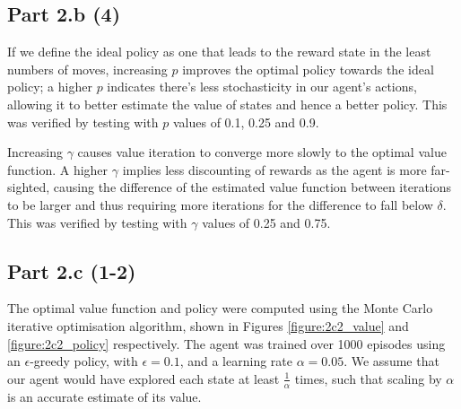 \documentclass[12pt]{article}
\begin{document}
\subsection*{Part 2.b (4)}

If we define the ideal policy as one that leads to the reward state in the least numbers of moves, increasing \(p\) improves the optimal policy towards the ideal policy; a higher \(p\) indicates there's less stochasticity in our agent's actions, allowing it to better estimate the value of states and hence a better policy. This was verified by testing with \(p\) values of 0.1, 0.25 and 0.9.\medskip

Increasing \(\gamma\) causes value iteration to converge more slowly to the optimal value function. A higher \(\gamma\) implies less discounting of rewards as the agent is more far-sighted, causing the difference of the estimated value function between iterations to be larger and thus requiring more iterations for the difference to fall below \(\delta\). This was verified by testing with \(\gamma\) values of 0.25 and 0.75.

\subsection*{Part 2.c (1-2)}

The optimal value function and policy were computed using the Monte Carlo iterative optimisation algorithm, shown in Figures \ref{figure:2c2_value} and \ref{figure:2c2_policy} respectively. The agent was trained over 1000 episodes using an \(\epsilon\)-greedy policy, with \(\epsilon = 0.1\), and a learning rate \(\alpha = 0.05\). We assume that our agent would have explored each state at least \(\frac{1}{\alpha}\) times, such that scaling by \(\alpha\) is an accurate estimate of its value.
\end{document}

